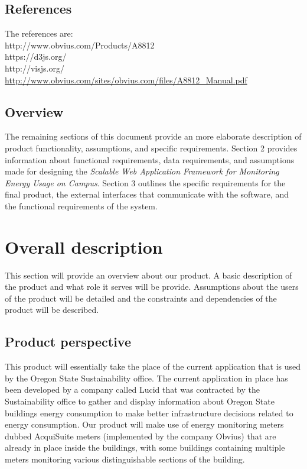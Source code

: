\documentclass[onecolumn, draftclsnofoot,10pt, compsoc]{IEEEtran}
\begin{document}
    \subsection{References} 
	The references are:\\
	http://www.obvius.com/Products/A8812 \\
    https://d3js.org/  \\
    http://visjs.org/  \\
    \url{http://www.obvius.com/sites/obvius.com/files/A8812_Manual.pdf}

    \subsection{Overview}
	The remaining sections of this document provide an more elaborate description of product functionality, assumptions, and specific requirements. Section 2 provides information about functional requirements, data requirements, and assumptions made for designing the \textit{Scalable Web Application Framework for Monitoring Energy Usage on Campus}. Section 3 outlines the specific requirements for the final product, the external interfaces that communicate with the software, and the functional requirements of the system.
	
    \section{Overall description}
    This section will provide an overview about our product. A basic description of the product and what role it serves will be provide. Assumptions about the users of the product will be detailed and the constraints and dependencies of the product will be described. 
    \subsection{Product perspective}
    This product will essentially take the place of the current application that is used by the Oregon State Sustainability office. The current application in place has been developed by a company called Lucid that was contracted by the Sustainability office to gather and display information about Oregon State buildings energy consumption to make better infrastructure decisions related to energy consumption. Our product will make use of energy monitoring meters dubbed AcquiSuite meters (implemented by the company Obvius) that are already in place inside the buildings, with some buildings containing multiple meters monitoring various distinguishable sections of the building.
    
\end{document}
